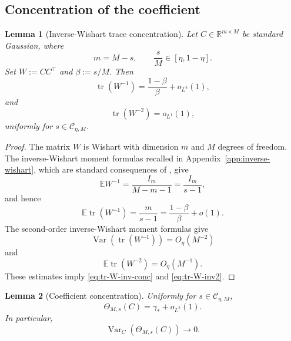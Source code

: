\documentclass[11pt]{article}
\newtheorem{lemma}{Lemma}
\DeclareMathOperator{\tr}{tr}
\DeclareMathOperator{\Var}{Var}
\newcommand{\R}{\mathbb R}
\newcommand{\Ebb}{\mathbb E}
\newcommand{\1}{\mathbf 1}
\begin{document}
\subsection{Concentration of the coefficient}

\begin{lemma}[Inverse-Wishart trace concentration]
\label{lem:inverse-wishart-concentration}
Let \(C\in\R^{m\times M}\) be standard Gaussian, where
\[
        m=M-s,
        \qquad
        \frac{s}{M}\in[\eta,1-\eta].
\]
Set \(W:=CC^\top\) and \(\beta:=s/M\).  Then
\begin{equation}
        \tr(W^{-1})=\frac{1-\beta}{\beta}+o_{L^2}(1),
        \label{eq:tr-W-inv-conc}
\end{equation}
and
\begin{equation}
        \tr(W^{-2})=o_{L^1}(1),
        \label{eq:tr-W-inv2}
\end{equation}
uniformly for \(s\in\mathcal C_{\eta,M}\).
\end{lemma}

\begin{proof}
The matrix \(W\) is Wishart with dimension \(m\) and \(M\) degrees of freedom.  The inverse-Wishart moment formulas recalled in Appendix~\ref{app:inverse-wishart}, which are standard consequences of \cite{Matsumoto2012,LetacMassam2004}, give
\[
        \Ebb W^{-1}=\frac{I_m}{M-m-1}=\frac{I_m}{s-1},
\]
and hence
\[
        \Ebb\tr(W^{-1})=\frac{m}{s-1}=\frac{1-\beta}{\beta}+o(1).
\]
The second-order inverse-Wishart moment formulas give
\[
        \Var(\tr(W^{-1}))=O_\eta(M^{-2})
\]
and
\[
        \Ebb\tr(W^{-2})=O_\eta(M^{-1}).
\]
These estimates imply \eqref{eq:tr-W-inv-conc} and \eqref{eq:tr-W-inv2}.
\end{proof}

\begin{lemma}[Coefficient concentration]
\label{lem:theta-concentration}
Uniformly for \(s\in\mathcal C_{\eta,M}\),
\begin{equation}
        \Theta_{M,s}(C)=\gamma_\ast+o_{L^2}(1).
        \label{eq:theta-conc}
\end{equation}
In particular,
\begin{equation}
        \Var_C(\Theta_{M,s}(C))\longrightarrow0.
        \label{eq:theta-var-zero}
\end{equation}
\end{lemma}
\end{document}
